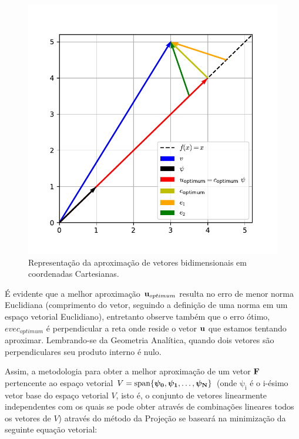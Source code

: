   \begin{figure}[ht]
	\centering
	\includegraphics[width=\linewidth]{./figures/2dvectors.pdf}
	\caption{Representação da aproximação de vetores bidimensionais em coordenadas
    Cartesianas.  \label{fig:2dvecs}}
  \end{figure}

  É evidente que a melhor aproximação $\bm{\mathrm{u}}_{optimum}$ resulta no erro de menor
  norma Euclidiana (comprimento do vetor, seguindo a definição de uma norma em um espaço
  vetorial Euclidiano), entretanto observe também que o erro ótimo,
  $evec_{optimum}$ é perpendicular a reta onde reside o vetor $\bm{\mathrm{u}}$ que estamos
  tentando aproximar. Lembrando-se da Geometria Analítica, quando dois vetores
  são perpendiculares seu produto interno é nulo.

  Assim, a metodologia para obter a melhor aproximação de um vetor $\bm{\mathrm{F}}$
  pertencente ao espaço vetorial $V=\operatorname{span} \{\bm{\mathrm{\psi_0}},
      \bm{\mathrm{\psi_1}}, \dots, \bm{\mathrm{\psi_N}} \}$ (onde
          $\bm{\mathrm{\psi_i}}$ é o i-ésimo vetor base do espaço vetorial $V$,
            isto é, o conjunto de vetores linearmente independentes com os quais
            se pode obter através de combinações lineares todos os vetores de $V$) através do método da Projeção se
  baseará na minimização da seguinte equação vetorial:

